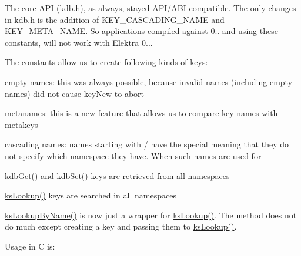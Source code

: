 The core A\+PI (kdb.\+h), as always, stayed A\+P\+I/\+A\+BI compatible. The only changes in kdb.\+h is the addition of {\ttfamily K\+E\+Y\+\_\+\+C\+A\+S\+C\+A\+D\+I\+N\+G\+\_\+\+N\+A\+ME} and {\ttfamily K\+E\+Y\+\_\+\+M\+E\+T\+A\+\_\+\+N\+A\+ME}. So applications compiled against 0.. and using these constants, will not work with Elektra 0...

The constants allow us to create following kinds of keys\+:


\begin{DoxyItemize}
\item empty names\+: this was always possible, because invalid names (including empty names) did not cause key\+New to abort
\item metanames\+: this is a new feature that allows us to compare key names with metakeys
\item cascading names\+: names starting with / have the special meaning that they do not specify which namespace they have. When such names are used for
\begin{DoxyItemize}
\item \hyperlink{group__kdb_ga28e385fd9cb7ccfe0b2f1ed2f62453a1}{kdb\+Get()} and \hyperlink{group__kdb_ga11436b058408f83d303ca5e996832bcf}{kdb\+Set()} keys are retrieved from all namespaces
\item \hyperlink{group__keyset_ga60f1ddcf23272f2b29b90e92ebe9b56f}{ks\+Lookup()} keys are searched in all namespaces
\item \hyperlink{group__keyset_gad65d2cdcbb5381194a1688e169af8a83}{ks\+Lookup\+By\+Name()} is now just a wrapper for \hyperlink{group__keyset_ga60f1ddcf23272f2b29b90e92ebe9b56f}{ks\+Lookup()}. The method does not do much except creating a key and passing them to \hyperlink{group__keyset_ga60f1ddcf23272f2b29b90e92ebe9b56f}{ks\+Lookup()}.
\end{DoxyItemize}
\end{DoxyItemize}

Usage in C is\+:




